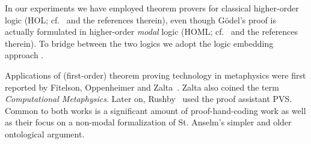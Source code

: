 \documentclass{llncs}
\newcommand{\logic}[1]{\textbf{#1}\xspace}
\newcommand{\SFiveU}{\logic{S5\textsuperscript{U}}}
\begin{document}

In our experiments we have employed theorem provers for classical
higher-order logic (HOL; cf.~\cite{andrewsSEP} and the references
therein), even though G\"odel's proof is actually formulated in
higher-order \emph{modal} logic (HOML; cf.~\cite{homl} and the
references therein). To bridge between the two logics we adopt the
logic embedding approach \cite{J23,C40}.

Applications of (first-order) theorem proving technology in
metaphysics were first reported by Fitelson, Oppenheimer and
Zalta~\cite{FitelsonZalta,oppenheimer11}. Zalta also coined the term
\textit{Computational Metaphysics}. Later on, Rushby~\cite{rushby13} used the proof
assistant \textsc{PVS}. Common to both works is a
significant amount of proof-hand-coding work as well as their focus on
a non-modal formalization of St. Anselm's simpler
and older ontological argument. %
\end{document}
